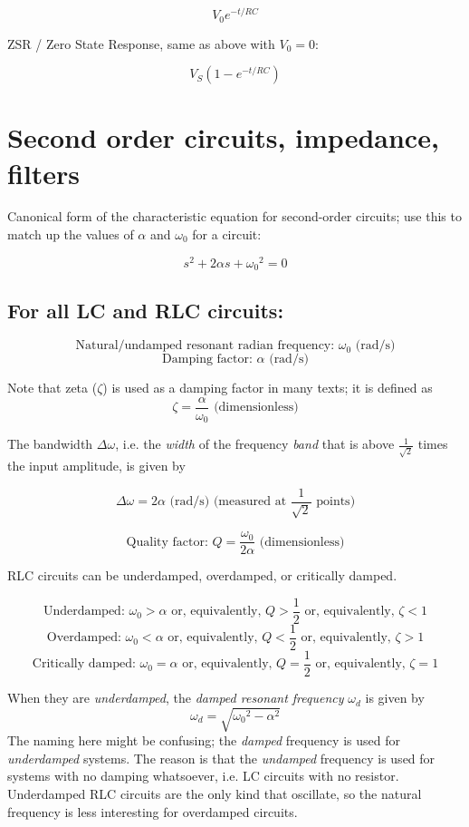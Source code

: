 \documentclass[12pt,a4paper]{report}
\begin{document}
\[ V_0 e^{-t/RC} \]

ZSR / Zero State Response, same as above with $V_0 = 0$:

\[ V_S(1 - e^{-t/RC}) \]

\newpage

\section{Second order circuits, impedance, filters}

Canonical form of the characteristic equation for second-order circuits; use this to match up the values of $\alpha$ and $\omega_0$ for a circuit:

\[ s^2 + 2\alpha s + {\omega_0}^2 = 0 \]

\subsection{For all LC and RLC circuits:}

\[ \text{Natural/undamped resonant radian frequency: } \omega_0 \text{ (rad/s)} \]
\[ \text{Damping factor: } \alpha \text{ (rad/s)} \]

Note that zeta ($\zeta$) is used as a damping factor in many texts; it is defined as
\[ \zeta = \frac{\alpha}{\omega_0} \text{ (dimensionless)} \]

The bandwidth $\Delta \omega$, i.e. the \emph{width} of the frequency \emph{band} that is above $\displaystyle \frac{1}{\sqrt{2}}$ times the input amplitude, is given by

\[ \Delta \omega = 2 \alpha \text{ (rad/s) (measured at } \frac{1}{\sqrt{2}} \text{ points)} \]

\[ \text{Quality factor: } Q = \frac{\omega_0}{2\alpha} \text{ (dimensionless)} \]

RLC circuits can be underdamped, overdamped, or critically damped.

\[ \text{Underdamped: } \omega_0 > \alpha \text{ or, equivalently, } Q > \frac{1}{2} \text { or, equivalently, } \zeta < 1 \]
\[ \text{Overdamped: } \omega_0 < \alpha \text{ or, equivalently, } Q < \frac{1}{2} \text { or, equivalently, } \zeta > 1 \]
\[ \text{Critically damped: } \omega_0 = \alpha \text{ or, equivalently, } Q = \frac{1}{2} \text { or, equivalently, } \zeta = 1 \]

When they are \emph{underdamped}, the \emph{damped resonant frequency} $\omega_d$ is given by
\[ \omega_d = \sqrt{{\omega_0}^2 - \alpha^2} \]
The naming here might be confusing; the \emph{damped} frequency is used for \emph{underdamped} systems. The reason is that the \emph{undamped} frequency is used for systems with no damping whatsoever, i.e. LC circuits with no resistor.\\
Underdamped RLC circuits are the only kind that oscillate, so the natural frequency is less interesting for overdamped circuits.
\end{document}
